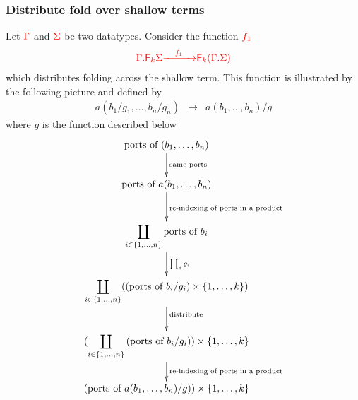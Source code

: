 \subsubsection{Distribute fold over shallow terms}
 Let ${\color{red}{\Gamma}}$ and ${\color{red}{\Sigma}}$ be two datatypes.  Consider the function ${\color{red}{f_1}}$
\begin{align*}
{\color{red}{{\color{red}{\Gamma . {\color{red}{\mathsf F_{k}}}\Sigma}}}} {\color{red}{\xrightarrow{\quad f_1 \quad}}} {\color{red}{{\color{red}{\mathsf F_{k}}}({\color{red}{\Gamma . \Sigma}})}}
\end{align*}
which distributes  folding across the shallow term. This function is illustrated by the following picture
and  defined by 
$$\begin{array}{rcl} 
a(b_1/g_1,\dots,b_n/g_n)&\mapsto& a(b_1,\dots,b_n)/g
\end{array}$$
where $g$ is the function described below
\begin{align*}
    \xymatrix@C=5cm{
        \text{ports of $(b_1,\ldots,b_n)$} 
        \ar[d]^{\text{same ports}}
        \\
        \text{ports of $a(b_1,\ldots,b_n)$} 
        \ar[d]^{\text{re-indexing of ports in a product}}
        \\
        \displaystyle{
        \coprod_{i \in \set{1,\ldots,n}} \text{ports of $b_i$}} \ar[d]^-{\coprod_i g_i} 
        \\
        \displaystyle{
        \coprod_{i \in \set{1,\ldots,n}}  (\text{(ports of $b_i/g_i$)}} \times \set{1,\ldots,k})
        \ar[d]^{\text{distribute}}
        \\
        \displaystyle{
        (\coprod_{i \in \set{1,\ldots,n}}  \text{(ports of $b_i/g_i$)}}) \times \set{1,\ldots,k}
        \ar[d]^-{\text{re-indexing of ports in a product}}
        \\             
        \displaystyle{
              \text{(ports of $a(b_1,\ldots,b_n)/g$)}}) \times \set{1,\ldots,k}
        }
    \end{align*}



\smallskip

